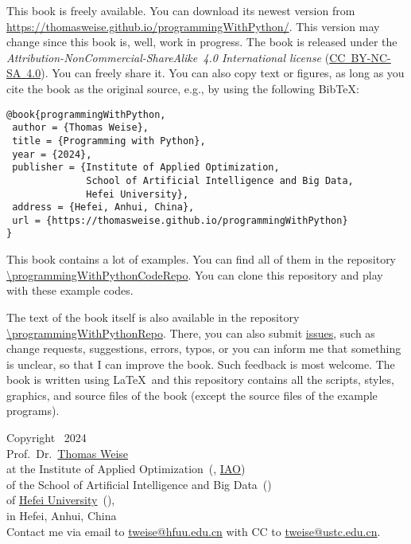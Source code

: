 This book is freely available.
You can download its newest version from \url{https://thomasweise.github.io/programmingWithPython/}.
This version may change since this book is, well, work in progress.
The book is released under the \emph{Attribution-NonCommercial-ShareAlike~4.0 International license} (\href{http://creativecommons.org/licenses/by-nc-sa/4.0/}{\mbox{CC~BY-NC-SA~4.0}}).
You can freely share it.
You can also copy text or figures, as long as you cite the book as the original source, e.g., by using the following Bib\TeX:%
%
\begin{lstlisting}[style=text_style]
@book{programmingWithPython,
 author = {Thomas Weise},
 title = {Programming with Python},
 year = {2024},
 publisher = {Institute of Applied Optimization,
              School of Artificial Intelligence and Big Data,
              Hefei University},
 address = {Hefei, Anhui, China},
 url = {https://thomasweise.github.io/programmingWithPython}
}
\end{lstlisting}
%
This book contains a lot of examples.
You can find all of them in the repository \url{\programmingWithPythonCodeRepo}.
You can clone this repository and play with these example codes.%
%
\begin{sloppypar}%
The text of the book itself is also available in the repository \url{\programmingWithPythonRepo}.
There, you can also submit \href{\programmingWithPythonRepo/issues}{issues}, such as change requests, suggestions, errors, typos, or you can inform me that something is unclear, so that I can improve the book.
Such feedback is most welcome.
The book is written using \LaTeX\ and this repository contains all the scripts, styles, graphics, and source files of the book (except the source files of the example programs).%
\end{sloppypar}%
%
\strut\vfill\strut%
%
\begin{flushleft}%
Copyright \textcopyright\ 2024\\[3pt]%
Prof.~Dr.~\href{http://iao.hfuu.edu.cn/5}{Thomas Weise}~\\%
at the Institute of Applied Optimization~(, \href{http://iao.hfuu.edu.cn}{IAO})\\%
of the School of Artificial Intelligence and Big Data~(\href{http://www.hfuu.edu.cn/aibd}{})\\%
of \href{http://www.hfuu.edu.cn/english}{Hefei University}~(\href{http://www.hfuu.edu.cn}{}),\\%
in Hefei, Anhui, China~\\[6pt]%
Contact me via email to \href{mailto:tweise@hfuu.edu.cn}{tweise@hfuu.edu.cn} with CC to \href{mailto:tweise@ustc.edu.cn}{tweise@ustc.edu.cn}.%
\end{flushleft}%
